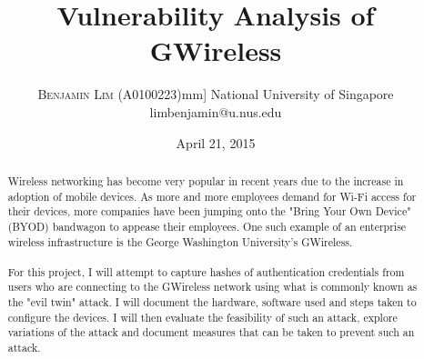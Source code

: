 \documentclass[twoside]{article}
\title{\vspace{-15mm}\fontsize{24pt}{10pt}\selectfont\textbf{Vulnerability Analysis of GWireless}}
\author{
\large
\textsc{Benjamin Lim (A0100223)}\2mm] \normalsize National University of Singapore \\ \normalsize limbenjamin@u.nus.edu \\ }
\date{April 21, 2015}
\begin{document}
\maketitle 

\thispagestyle{fancy} 



\begin{abstract}

\noindent Wireless networking has become very popular in recent years due to the increase in adoption of mobile devices. As more and more employees demand for Wi-Fi access for their devices, more companies have been jumping onto the "Bring Your Own Device" (BYOD) bandwagon\cite{1} to appease their employees. One such example of an enterprise wireless infrastructure is the George Washington University's GWireless.
\\
\\For this project, I will attempt to capture hashes of authentication credentials from users who are connecting to the GWireless network using what is commonly known as the "evil twin" attack. I will document the hardware, software used and steps taken to configure the devices. I will then evaluate the feasibility of such an attack, explore variations of the attack and document measures that can be taken to prevent such an attack.

\end{abstract}
\end{document}
